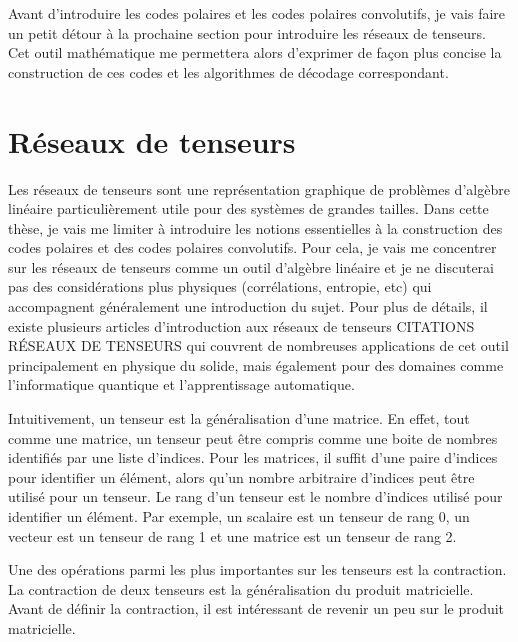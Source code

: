Avant d'introduire les codes polaires et les codes polaires convolutifs,
je vais faire un petit détour à la prochaine section pour introduire les réseaux de tenseurs.
Cet outil mathématique me permettera alors d'exprimer de façon plus concise la construction
de ces codes et les algorithmes de décodage correspondant.

\section{Réseaux de tenseurs}
\label{sec:reseaux_tenseurs}

Les réseaux de tenseurs sont une représentation graphique de problèmes d'algèbre linéaire
particulièrement utile pour des systèmes de grandes tailles.
Dans cette thèse, 
je vais me limiter à introduire les notions essentielles à la construction des 
codes polaires et des codes polaires convolutifs.
Pour cela, 
je vais me concentrer sur les réseaux de tenseurs comme un outil d'algèbre linéaire 
et je ne discuterai pas des considérations plus physiques (corrélations, entropie, etc) 
qui accompagnent généralement une introduction du sujet.
Pour plus de détails,
il existe plusieurs articles d'introduction aux réseaux de tenseurs CITATIONS RÉSEAUX DE TENSEURS
qui couvrent de nombreuses applications de cet outil principalement en physique du solide,
mais également pour des domaines comme l'informatique quantique et l'apprentissage automatique. 

Intuitivement, 
un tenseur est la généralisation d'une matrice.
En effet,
tout comme une matrice, 
un tenseur peut être compris comme une boite de nombres identifiés par une liste d'indices. 
Pour les matrices,
il suffit d'une paire d'indices pour identifier un élément,
alors qu'un nombre arbitraire d'indices peut être utilisé pour un tenseur. 
Le rang d'un tenseur est le nombre d'indices utilisé pour identifier un élément.
Par exemple, 
un scalaire est un tenseur de rang 0, 
un vecteur est un tenseur de rang 1 
et une matrice est un tenseur de rang 2.

Une des opérations parmi les plus importantes sur les tenseurs est la contraction.
La contraction de deux tenseurs est la généralisation du produit matricielle.
Avant de définir la contraction,
il est intéressant de revenir un peu sur le produit matricielle.

